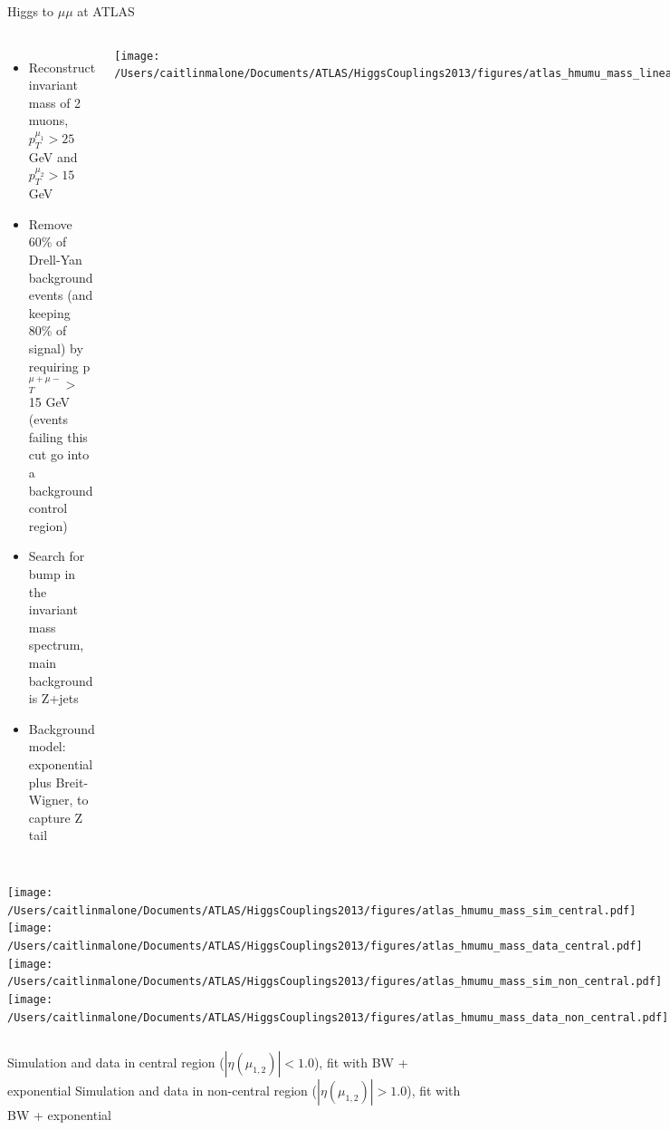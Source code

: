 \documentclass{beamer}
\begin{document}
\begin{frame}{Higgs to $\mu \mu$ at ATLAS}
	\begin{columns}[c]
	\column{2.5in}
		\begin{itemize}  \scriptsize
			\item \textcolor{BrickRed}{Reconstruct invariant mass of 2 muons, $p_{T}^{\mu_1}>25$ GeV and $p_{T}^{\mu_2}>15$ GeV}
			\item Remove 60\% of Drell-Yan background events (and keeping 80\% of signal) by requiring p$_T^{\mu+\mu-}>$ 15 GeV (events failing this cut go into a background control region)
			\item Search for bump in the invariant mass spectrum, main background is Z+jets
			\item Background model: exponential plus Breit-Wigner, to capture Z tail
		\end{itemize}
	\column{2.5in}
			\texttt{[image: /Users/caitlinmalone/Documents/ATLAS/HiggsCouplings2013/figures/atlas\_hmumu\_mass\_linear.pdf]} \\
	\end{columns}
	\begin{columns}[c]
			\texttt{[image: /Users/caitlinmalone/Documents/ATLAS/HiggsCouplings2013/figures/atlas\_hmumu\_mass\_sim\_central.pdf]}
			\texttt{[image: /Users/caitlinmalone/Documents/ATLAS/HiggsCouplings2013/figures/atlas\_hmumu\_mass\_data\_central.pdf]}
			\texttt{[image: /Users/caitlinmalone/Documents/ATLAS/HiggsCouplings2013/figures/atlas\_hmumu\_mass\_sim\_non\_central.pdf]}
			\texttt{[image: /Users/caitlinmalone/Documents/ATLAS/HiggsCouplings2013/figures/atlas\_hmumu\_mass\_data\_non\_central.pdf]}
	\end{columns}
	\begin{columns}[c]
		\tiny{Simulation and data in central region ($|\eta(\mu_{1,2})|<1.0$), fit with BW + exponential}
		\tiny{Simulation and data in non-central region ($|\eta(\mu_{1,2})|>1.0$), fit with BW + exponential}
	\end{columns}
	
\end{frame}
\end{document}
